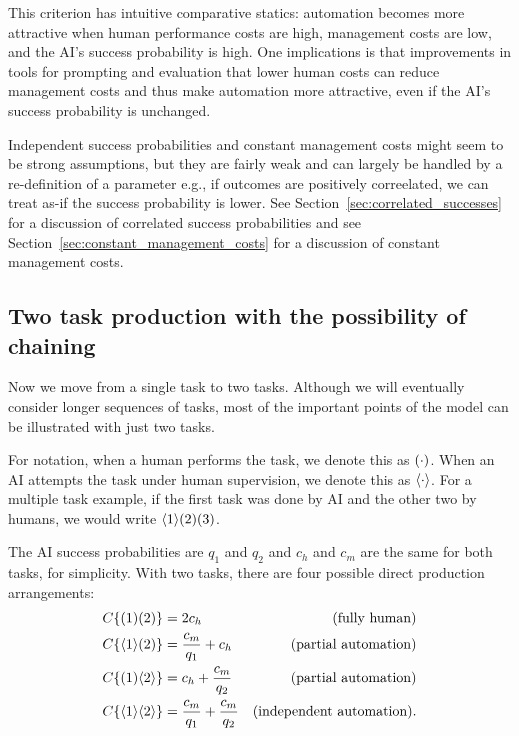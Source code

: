 \documentclass{article}
\theoremstyle{plain}
\theoremstyle{plain}
\begin{document}
This criterion has intuitive comparative statics: automation becomes more attractive when human performance costs are high, management costs are low, and the AI's success probability is high.
One implications is that improvements in tools for prompting and evaluation that lower human costs can reduce management costs and thus make automation more attractive, even if the AI's success probability is unchanged.

Independent success probabilities and constant management costs might seem to be strong assumptions, but they are fairly weak and can largely be handled by a re-definition of a parameter e.g., if outcomes are positively correelated, we can treat as-if the success probability is lower. 
See Section~\ref{sec:correlated_successes} for a discussion of correlated success probabilities and see Section~\ref{sec:constant_management_costs} for a discussion of constant management costs.

\subsection{Two task production with the possibility of chaining}
Now we move from a single task to two tasks.  
Although we will eventually consider longer sequences of tasks, most of the important points of the model can be illustrated with just two tasks.

For notation, when a human performs the task, we denote this as $( \cdot )$.
When an AI attempts the task under human supervision, we denote this as $\langle \cdot \rangle$.
For a multiple task example, if the first task was done by AI and the other two by humans, we would write $\langle 1 \rangle( 2 )( 3 )$.

The AI success probabilities are $q_1$ and $q_2$ and $c_h$ and $c_m$ are the same for both tasks, for simplicity.
With two tasks, there are four possible direct production arrangements:
\begin{align*}
    C\{ ( 1 )( 2 ) \} &= 2c_h & \text{(fully human)} \\
    C\{ \langle 1 \rangle( 2 ) \} &= \frac{c_m}{q_1} + c_h & \text{(partial automation)} \\
    C\{ ( 1 )\langle 2 \rangle \} &= c_h + \frac{c_m}{q_2} & \text{(partial automation)} \\
    C\{ \langle 1 \rangle\langle 2 \rangle \} &= \frac{c_m}{q_1} + \frac{c_m}{q_2} & \text{(independent automation)}. \\
\end{align*}
\end{document}
